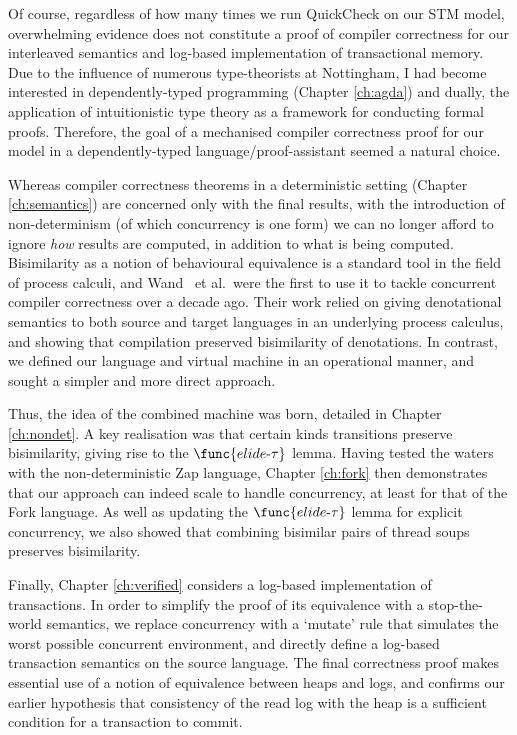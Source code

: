 Of course, regardless of how many times we run QuickCheck on our STM model,
overwhelming evidence does not constitute a proof of compiler correctness
for our interleaved semantics and log-based implementation of transactional
memory. Due to the influence of numerous type-theorists at Nottingham, I had
become interested in dependently-typed programming (Chapter \ref{ch:agda})
and dually, the application of intuitionistic type theory as a framework for
conducting formal proofs. Therefore, the goal of a mechanised compiler
correctness proof for our model in a dependently-typed
language/proof-assistant seemed a natural choice.

Whereas compiler correctness theorems in a deterministic setting (Chapter
\ref{ch:semantics}) are concerned only with the final results, with the
introduction of non-determinism (of which concurrency is one form) we can no
longer afford to ignore \emph{how} results are computed, in addition to what
is being computed. Bisimilarity as a notion of behavioural equivalence is
a standard tool in the field of process calculi, and
Wand~\cite{wand95-parallel,wand95-denotational,gladstein96-concurrent} et
al.~were the first to use it to tackle concurrent compiler correctness over
a decade ago. Their work relied on giving denotational semantics to both
source and target languages in an underlying process calculus, and showing
that compilation preserved bisimilarity of denotations. In contrast, we
defined our language and virtual machine in an operational manner, and
sought a simpler and more direct approach.

Thus, the idea of the combined machine was born, detailed in Chapter
\ref{ch:nondet}. A key realisation was that certain kinds transitions
preserve bisimilarity, giving rise to the $\func{elide\text-\tau}$ lemma.
Having tested the waters with the non-deterministic Zap language, Chapter
\ref{ch:fork} then demonstrates that our approach can indeed scale to handle
concurrency, at least for that of the Fork language. As well as updating the
$\func{elide\text-\tau}$ lemma for explicit concurrency, we also showed that
combining bisimilar pairs of thread soups preserves bisimilarity.

Finally, Chapter \ref{ch:verified} considers a log-based implementation of
transactions. In order to simplify the proof of its equivalence with
a stop-the-world semantics, we replace concurrency with a `mutate' rule that
simulates the worst possible concurrent environment, and directly define
a log-based transaction semantics on the source language. The final
correctness proof makes essential use of a notion of equivalence between
heaps and logs, and confirms our earlier hypothesis that consistency of the
read log with the heap is a sufficient condition for a transaction to
commit.

